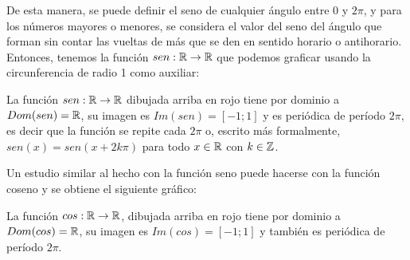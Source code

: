 \documentclass[../teoria.root.tex]{subfiles}
\begin{document}
De esta manera, se puede definir el seno de cualquier ángulo entre 0 y \(2\pi\), y para los números mayores o menores, se considera el valor del seno del ángulo que forman sin contar las vueltas de más que se den en sentido horario o antihorario.
Entonces, tenemos la función \(sen : \mathbb{R} \rightarrow \mathbb{R}\) que podemos graficar usando la circunferencia de radio 1 como auxiliar:
\begin{center}
    \begin{scaletikzpicturetowidth}{\linewidth}
    \end{scaletikzpicturetowidth}
\end{center}
La función \(sen: \mathbb{R}\rightarrow\mathbb{R}\) dibujada arriba en rojo tiene por dominio a \(Dom(sen) = \mathbb{R}\), su imagen es \(Im(sen) = [−1; 1]\) y es periódica de período \(2\pi\), es decir que la función se repite cada \(2\pi\) o, escrito más formalmente, \(sen(x) = sen(x + 2k\pi)\) para todo \(x \in \mathbb{R}\) con \(k \in \mathbb{Z}\).

Un estudio similar al hecho con la función seno puede hacerse con la función coseno y se obtiene el siguiente gráfico:
\begin{center}
\end{center}
La función \(cos:\mathbb{R}\rightarrow\mathbb{R}\), dibujada arriba en rojo tiene por dominio a \(Dom(cos) = \mathbb{R}\), su imagen es \(Im(cos) = [−1; 1]\) y también es periódica de período \(2\pi\).
\end{document}

